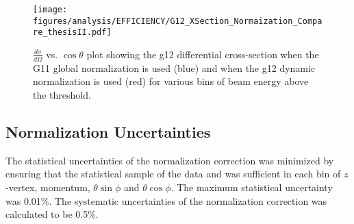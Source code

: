 \begin{figure}[h!]\begin{center}
\texttt{[image: \\figures/analysis/EFFICIENCY/G12\_XSection\_Normaization\_Compare\_thesisII.pdf]}
\caption[$\frac{d \sigma}{d \Omega}$ vs. $\cos \theta$ plot showing the g12 \pizT differential cross-section when the G11 global normalization is used (blue) and when the g12 dynamic normalization is used (red) for various bins of beam energy above  threshold]{\label{fig:toteff_compareII} $\frac{d \sigma}{d \Omega}$ vs. $\cos \theta$ plot showing the g12 \pizT differential cross-section when the G11 global normalization is used (blue) and when the g12 dynamic normalization is used (red) for various bins of beam energy above the  threshold.}
\end{center}\end{figure}

\FloatBarrier

\subsection{Normalization Uncertainties}
The statistical uncertainties of the normalization correction was minimized by ensuring that the statistical sample of the data and  was sufficient in each bin of $z$-vertex, momentum, $\theta \sin\phi$ and $\theta \cos\phi$. The maximum statistical uncertainty was 0.01\%. The systematic uncertainties of the normalization correction was calculated to be 0.5\%.